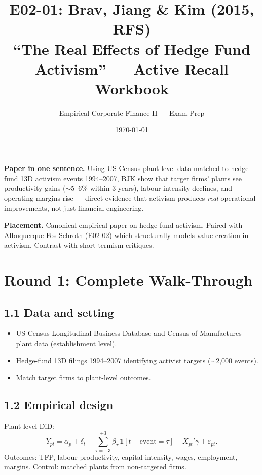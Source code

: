 \documentclass[11pt]{article}
\title{E02-01: Brav, Jiang \& Kim (2015, RFS) \\
\large ``The Real Effects of Hedge Fund Activism'' --- Active Recall Workbook}
\author{Empirical Corporate Finance II --- Exam Prep}
\date{\today}
\begin{document}
\maketitle

\begin{keybox}
\textbf{Paper in one sentence.} Using US Census plant-level data matched to hedge-fund 13D activism events 1994--2007, BJK show that target firms' plants see productivity gains ($\sim$5--6\% within 3 years), labour-intensity declines, and operating margins rise --- direct evidence that activism produces \emph{real} operational improvements, not just financial engineering.

\textbf{Placement.} Canonical empirical paper on hedge-fund activism. Paired with Albuquerque-Fos-Schroth (E02-02) which structurally models value creation in activism. Contrast with short-termism critiques.
\end{keybox}

\section*{Round 1: Complete Walk-Through}

\subsection*{1.1 Data and setting}
\begin{itemize}
\item US Census Longitudinal Business Database and Census of Manufactures plant data (establishment level).
\item Hedge-fund 13D filings 1994--2007 identifying activist targets ($\sim$2{,}000 events).
\item Match target firms to plant-level outcomes.
\end{itemize}

\subsection*{1.2 Empirical design}
Plant-level DiD:
\[
Y_{pt}=\alpha_p+\delta_t+\sum_{\tau=-3}^{+3}\beta_\tau\,\mathbf 1[t-\text{event}=\tau]+X_{pt}'\gamma+\varepsilon_{pt}.
\]
Outcomes: TFP, labour productivity, capital intensity, wages, employment, margins. Control: matched plants from non-targeted firms.
\end{document}
